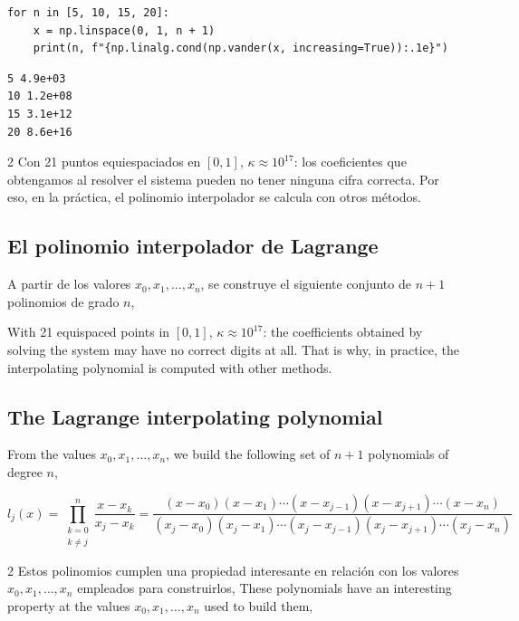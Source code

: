 \begin{verbatim}
for n in [5, 10, 15, 20]:
    x = np.linspace(0, 1, n + 1)
    print(n, f"{np.linalg.cond(np.vander(x, increasing=True)):.1e}")
\end{verbatim}
\begin{verbatim}
5 4.9e+03
10 1.2e+08
15 3.1e+12
20 8.6e+16
\end{verbatim}

\begin{paracol}{2}
Con 21 puntos equiespaciados en $[0,1]$, $\kappa\approx 10^{17}$: los coeficientes que obtengamos al resolver el sistema pueden no tener ninguna cifra correcta. Por eso, en la práctica, el polinomio interpolador se calcula con otros métodos.

\subsection{El polinomio interpolador de Lagrange} \label{sec:lagranje} 

A partir de los valores $x_0, x_1,\dots, x_n$, se construye el siguiente conjunto de $n+1$ polinomios de grado $n$,

\switchcolumn
With 21 equispaced points in $[0,1]$, $\kappa\approx 10^{17}$: the coefficients obtained by solving the system may have no correct digits at all. That is why, in practice, the interpolating polynomial is computed with other methods.

\subsection{The Lagrange interpolating polynomial} 
From the values $x_0,x_1,\dots,x_n$, we build the following set of $n+1$ polynomials of degree $n$,
\end{paracol}
\begin{equation*}
l_j(x)=\prod_{\substack{k=0\\
k\neq j}}^n\frac{x-x_k}{x_j-x_k}=\frac{(x-x_0)(x-x_1)\cdots(x-x_{j-1})(x-x_{j+1})\cdots(x-x_n)}{(x_j-x_0)(x_j-x_1)\cdots(x_j-x_{j-1})(x_j-x_{j+1})\cdots(x_j-x_n)}
\end{equation*}
\begin{paracol}{2}
Estos polinomios cumplen una propiedad interesante en relación con los valores $x_0, x_1,\dots, x_n$ empleados para construirlos,
\switchcolumn
These polynomials have an interesting property at the values $x_0, x_1,\dots, x_n$ used to build them,
\end{paracol}
